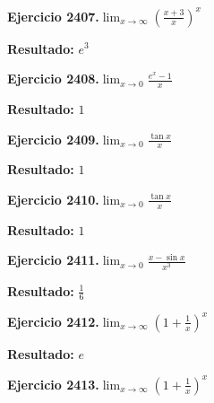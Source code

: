 \documentclass[10pt,a4paper]{article}
\begin{document}
\begin{ejbox}
\textbf{Ejercicio 2407.}\quad $\lim_{x\to \infty} \left(\frac{x+3}{x}\right)^{x}$
\end{ejbox}

\begin{solbox}
\textbf{Resultado:} \(\displaystyle e^{3}\)
\end{solbox}

\begin{ejbox}
\textbf{Ejercicio 2408.}\quad $\lim_{x\to 0} \frac{e^x-1}{x}$
\end{ejbox}

\begin{solbox}
\textbf{Resultado:} \(\displaystyle 1\)
\end{solbox}

\newpage
\begin{ejbox}
\textbf{Ejercicio 2409.}\quad $\lim_{x\to 0} \frac{\tan x}{x}$
\end{ejbox}

\begin{solbox}
\textbf{Resultado:} \(\displaystyle 1\)
\end{solbox}

\begin{ejbox}
\textbf{Ejercicio 2410.}\quad $\lim_{x\to 0} \frac{\tan x}{x}$
\end{ejbox}

\begin{solbox}
\textbf{Resultado:} \(\displaystyle 1\)
\end{solbox}

\begin{ejbox}
\textbf{Ejercicio 2411.}\quad $\lim_{x\to 0} \frac{x-\sin x}{x^3}$
\end{ejbox}

\begin{solbox}
\textbf{Resultado:} \(\displaystyle \frac{1}{6}\)
\end{solbox}

\newpage
\begin{ejbox}
\textbf{Ejercicio 2412.}\quad $\lim_{x\to \infty} \left(1+\frac{1}{x}\right)^x$
\end{ejbox}

\begin{solbox}
\textbf{Resultado:} \(\displaystyle e\)
\end{solbox}

\begin{ejbox}
\textbf{Ejercicio 2413.}\quad $\lim_{x\to \infty} \left(1+\frac{1}{x}\right)^x$
\end{ejbox}
\end{document}
